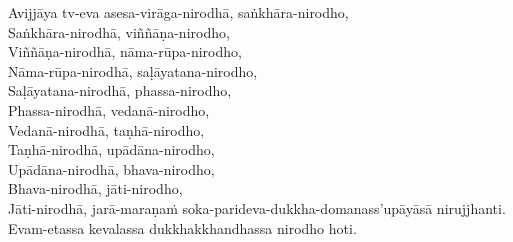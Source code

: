 Avijjāya tv-eva asesa-virāga-nirodhā, saṅkhāra-nirodho,\\
Saṅkhāra-nirodhā, viññāṇa-nirodho,\\
Viññāṇa-nirodhā, nāma-rūpa-nirodho,\\
Nāma-rūpa-nirodhā, saḷāyatana-nirodho,\\
Saḷāyatana-nirodhā, phassa-nirodho,\\
Phassa-nirodhā, vedanā-nirodho,\\
Vedanā-nirodhā, taṇhā-nirodho,\\
Taṇhā-nirodhā, upādāna-nirodho,\\
Upādāna-nirodhā, bhava-nirodho,\\
Bhava-nirodhā, jāti-nirodho,\\
Jāti-nirodhā, jarā-maraṇaṁ soka-parideva-dukkha-domanass’upāyāsā nirujjhanti.\\
Evam-etassa kevalassa dukkhakkhandhassa nirodho hoti.

